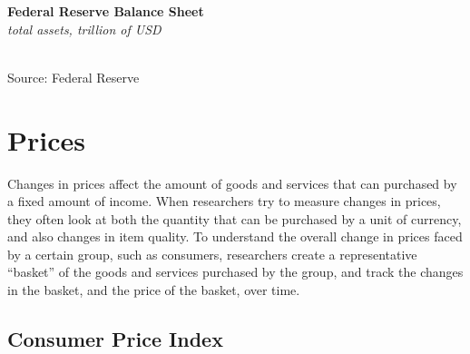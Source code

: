 \documentclass{report}
\makeatletter
\newcommand{\tbllink}[1]{\href{https://raw.githubusercontent.com/bdecon/US-chartbook/master/chartbook/data/#1}{\faTable}}
\newcommand*\short[1]{\expandafter\@gobbletwo\number\numexpr#1\relax}
\newcommand{\dateaxisticks}{
		date coordinates in=x, axis line style={draw=none},
		xmax={2020-05-10},
		max space between ticks=40,	    
		xtick={{1990-01-01}, {1992-01-01}, {1994-01-01}, 
			{1996-01-01}, {1998-01-01}, {2000-01-01}, 
			{2002-01-01}, {2004-01-01}, {2006-01-01},
			{2008-01-01}, {2010-01-01}, {2012-01-01}, {2014-01-01},
		    {2016-01-01}, {2018-01-01}, {2020-01-01}},
		minor xtick={{1989-01-01}, {1991-01-01}, {1993-01-01},
			{1995-01-01}, {1997-01-01}, {1999-01-01}, 
			{2001-01-01}, {2003-01-01}, {2005-01-01}, {2007-01-01},
		    {2009-01-01}, {2011-01-01}, {2013-01-01}, {2015-01-01},
		    {2017-01-01}, {2019-01-01}},
		enlarge y limits={0.06}, enlarge x limits={0.01},
		}
\newcommand{\bbar}[2]{extra #1 ticks = {{#2}}, extra #1 tick labels = ,
		extra #1 tick style = {grid=major, grid style={thick, black!25}},}
\newcommand{\stdline}[4]{\addplot[very thick, no markers, color=#1] 
		table [x=#2, y=#3, col sep=comma] {#4};	}
\makeatother
\begin{document}
{{{{{{{{{\begin{minipage}{0.39\textwidth}
\noindent \normalsize \textbf{Federal Reserve Balance Sheet}\\
\footnotesize{\textit{total assets, trillion of USD}}\\ 
\noindent \hspace*{-2mm} \\
\footnotesize{Source: Federal Reserve} \hspace{22mm} \tbllink{fed_assets.csv}
\end{minipage}\hspace{1mm}
\begin{minipage}{0.36\textwidth}
\small 
\end{minipage}



\newpage

\begin{minipage}{0.76\textwidth}
\section*{\color{darkgray}\LARGE \seriffont Prices}
\label{sec:pr}
\small 
Changes in prices affect the amount of goods and services that can purchased by a fixed amount of income. When researchers try to measure changes in prices, they often look at both the quantity that can be purchased by a unit of currency, and also changes in item quality. To understand the overall change in prices faced by a certain group, such as consumers, researchers create a representative ``basket'' of the goods and services purchased by the group, and track the changes in the basket, and the price of the basket, over time. 


\subsection*{\color{black!70} \seriffont Consumer Price Index}


\end{minipage}}}}}}}}}}
\end{document}
